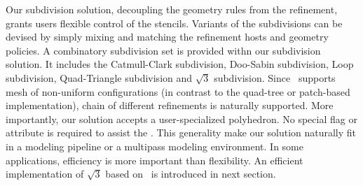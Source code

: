 Our subdivision solution, decoupling the geometry rules from the
refinement, grants users flexible control of the stencils.
Variants of the subdivisions can be devised by simply mixing
and matching the refinement hosts and geometry policies.
A combinatory subdivision set is provided withn our subdivision
solution. It includes the Catmull-Clark subdivision, Doo-Sabin 
subdivision, Loop subdivision, Quad-Triangle subdivision and
$\sqrt{3}$ subdivision. Since
\cgalpoly\ supports mesh of non-uniform configurations 
(in contrast to the quad-tree or patch-based 
implementation), chain of different refinements
is naturally supported.
More importantly, our solution accepts a user-specialized 
polyhedron. No special flag or attribute is required 
to assist the \tr . This generality make our solution 
naturally fit in a modeling pipeline or a multipass modeling 
environment. In some applications, efficiency is more
important than flexibility. An efficient implementation
of $\sqrt{3}$ based on \cgalpoly\ is introduced in next 
section.


 

